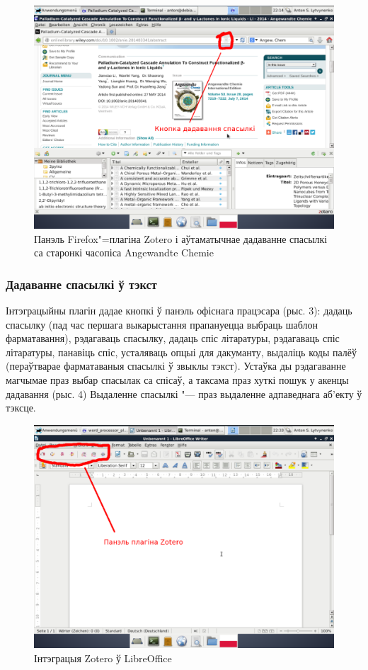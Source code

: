 \documentclass[10pt, a5paper]{article}
\begin{document}
\begin{figure}[h!]
  \centering
  \includegraphics[scale=0.2]{11_2014_Fig1.png}
  \caption{Панэль Firefox"=плагіна Zotero і аўтаматычнае дадаванне спасылкі са старонкі часопіса Angewandte Chemie}
\end{figure}



\subsubsection*{Дадаванне спасылкі ў тэкст}

Інтэграцыйны плагін дадае кнопкі ў панэль офіснага працэсара (рыс. 3): дадаць спасылку (пад час першага выкарыстання прапануецца выбраць шаблон фарматавання), рэдагаваць спасылку, дадаць спіс літаратуры, рэдагаваць спіс літаратуры, панавіць спіс, усталяваць опцыі для дакуманту, выдаліць коды палёў (пераўтварае фарматаваныя спасылкі ў звыклы тэкст). Устаўка ды рэдагаванне магчымае праз выбар спасылак са спісаў, а таксама праз хуткі пошук у акенцы дадавання (рыс. 4) Выдаленне спасылкі "--- праз выдаленне адпаведнага аб’екту ў тэксце.



\begin{figure}[h!]
  \centering
  \includegraphics[scale=0.2]{11_2014_Fig2.png}
  \caption{Інтэграцыя Zotero ў LibreOffice}
\end{figure}
\end{document}
